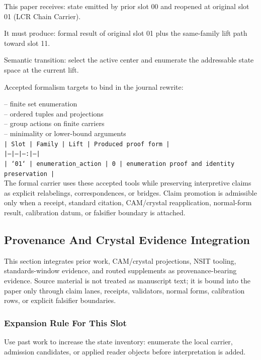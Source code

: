 \documentclass[11pt]{article}
\begin{document}
This paper receives: state emitted by prior slot 00 and reopened at original slot 01 (LCR Chain Carrier).

It must produce: formal result of original slot 01 plus the same-family lift path toward slot 11.

Semantic transition: select the active center and enumerate the addressable state space at the current lift.

Accepted formalism targets to bind in the journal rewrite:

\noindent{}-- finite set enumeration\\
\noindent{}-- ordered tuples and projections\\
\noindent{}-- group actions on finite carriers\\
\noindent{}-- minimality or lower-bound arguments\\

\noindent\texttt{| Slot | Family | Lift | Produced proof form |}\\
\noindent\texttt{|---|---|---:|---|}\\
\noindent\texttt{| `01` | enumeration\_action | 0 | enumeration proof and identity preservation |}\\

The formal carrier uses these accepted tools while preserving interpretive
claims as explicit relabelings, correspondences, or bridges. Claim promotion is admissible only when a receipt, standard citation,
CAM/crystal reapplication, normal-form result, calibration datum, or falsifier
boundary is attached.

\subsection*{Provenance And Crystal Evidence Integration}

This section integrates prior work, CAM/crystal projections, NSIT tooling,
standards-window evidence, and routed supplements as provenance-bearing
evidence. Source material is not treated as manuscript text; it is bound into
the paper only through claim lanes, receipts, validators, normal forms,
calibration rows, or explicit falsifier boundaries.

\subsubsection*{Expansion Rule For This Slot}

Use past work to increase the state inventory: enumerate the local carrier, admission candidates, or applied reader objects before interpretation is added.
\end{document}
